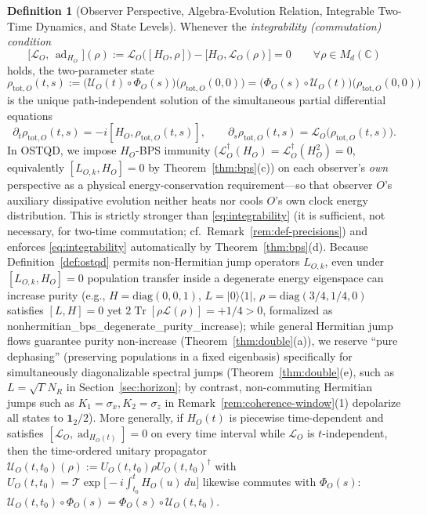 \documentclass[11pt,a4paper]{article}
\theoremstyle{definition}
\newtheorem{definition}{Definition}
\theoremstyle{remark}
\newcommand{\Tr}{\operatorname{Tr}}
\newcommand{\ad}{\operatorname{ad}}
\newcommand{\cL}{\mathcal{L}}
\newcommand{\cU}{\mathcal{U}}
\newcommand{\bbC}{\mathbb{C}}
\newcommand{\1}{\mathbf{1}}
\newcommand{\code}[1]{{\footnotesize\ttfamily #1}}
\begin{document}
\begin{definition}[Observer Perspective, Algebra-Evolution Relation, Integrable Two-Time Dynamics, and State Levels]
Whenever the \emph{integrability (commutation) condition}
\begin{equation}\label{eq:integrability}
  \bigl[\cL_O,\,\ad_{H_O}\bigr](\rho) := \cL_O\bigl([H_O,\rho]\bigr) - \bigl[H_O,\cL_O(\rho)\bigr] = 0 \qquad \forall \rho \in M_d(\bbC)
\end{equation}
holds, the two-parameter state
\[
  \rho_{\mathrm{tot},O}(t,s) := \bigl(\cU_O(t)\circ\Phi_O(s)\bigr)\bigl(\rho_{\mathrm{tot},O}(0,0)\bigr) = \bigl(\Phi_O(s)\circ\cU_O(t)\bigr)\bigl(\rho_{\mathrm{tot},O}(0,0)\bigr)
\]
is the unique path-independent solution of the simultaneous partial differential equations
\begin{equation}\label{eq:two-time}
  \partial_t \rho_{\mathrm{tot},O}(t,s) = -i[H_O, \rho_{\mathrm{tot},O}(t,s)], \qquad
  \partial_s \rho_{\mathrm{tot},O}(t,s) = \cL_O\bigl(\rho_{\mathrm{tot},O}(t,s)\bigr).
\end{equation}
In OSTQD, we impose $H_O$-BPS immunity ($\cL_O^\dagger(H_O) = \cL_O^\dagger(H_O^2) = 0$, equivalently $[L_{O,k}, H_O]=0$ by Theorem~\ref{thm:bps}(c)) on each observer's \emph{own} perspective as a physical energy-conservation requirement---so that observer $O$'s auxiliary dissipative evolution neither heats nor cools $O$'s own clock energy distribution. This is strictly stronger than \eqref{eq:integrability} (it is sufficient, not necessary, for two-time commutation; cf.\ Remark~\ref{rem:def-precisions}) and enforces \eqref{eq:integrability} automatically by Theorem~\ref{thm:bps}(d). Because Definition~\ref{def:ostqd} permits non-Hermitian jump operators $L_{O,k}$, even under $[L_{O,k}, H_O]=0$ population transfer inside a degenerate energy eigenspace can increase purity (e.g., $H=\mathrm{diag}(0,0,1)$, $L=|0\rangle\langle 1|$, $\rho=\mathrm{diag}(3/4,1/4,0)$ satisfies $[L,H]=0$ yet $2\Tr[\rho\cL(\rho)] = +1/4 > 0$, formalized as \code{nonhermitian\_\allowbreak bps\_\allowbreak degenerate\_\allowbreak purity\_\allowbreak increase}); while general Hermitian jump flows guarantee purity non-increase (Theorem~\ref{thm:double}(a)), we reserve ``pure dephasing'' (preserving populations in a fixed eigenbasis) specifically for simultaneously diagonalizable spectral jumps (Theorem~\ref{thm:double}(e), such as $L=\sqrt{\Gamma}N_R$ in Section~\ref{sec:horizon}; by contrast, non-commuting Hermitian jumps such as $K_1=\sigma_x, K_2=\sigma_z$ in Remark~\ref{rem:coherence-window}(1) depolarize all states to $\1_2/2$). More generally, if $H_O(t)$ is piecewise time-dependent and satisfies $[\cL_O, \ad_{H_O(t)}] = 0$ on every time interval while $\cL_O$ is $t$-independent, then the time-ordered unitary propagator $\cU_O(t,t_0)(\rho) := U_O(t,t_0)\rho U_O(t,t_0)^\dagger$ with $U_O(t,t_0) = \mathcal{T}\exp\bigl[-i\int_{t_0}^t H_O(u)\,du\bigr]$ likewise commutes with $\Phi_O(s)$: $\cU_O(t,t_0)\circ\Phi_O(s) = \Phi_O(s)\circ\cU_O(t,t_0)$.
\end{definition}
\end{document}
